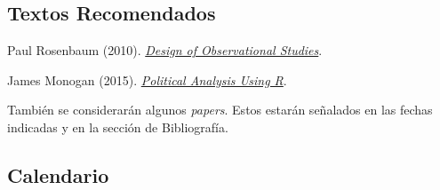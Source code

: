 \documentclass[letterpaper]{article}
\renewenvironment{itemize}{
  \begin{list}{}{
    \setlength{\leftmargin}{1.5em}
  }
}{
  \end{list}
}
\begin{document}
\subsection*{Textos Recomendados}

\begin{itemize}
  \item[$\bullet$] Paul Rosenbaum (2010). \href{https://github.com/hbahamonde/OLS/raw/master/Readings/Rosenbaum.pdf}{\emph{Design of Observational Studies}}.
  \item[$\bullet$] James Monogan (2015). \href{https://github.com/hbahamonde/OLS/raw/master/Readings/Monogan.pdf}{\emph{Political Analysis Using R}}.
\end{itemize}


\begin{itemize}
\item[{\color{red}\Pointinghand}] Tambi\'en se considerar\'an algunos \emph{papers}. Estos estar\'an se\~nalados en las fechas indicadas y en la secci\'on de Bibliograf\'ia.
\end{itemize}


\subsection*{Calendario}
\end{document}
